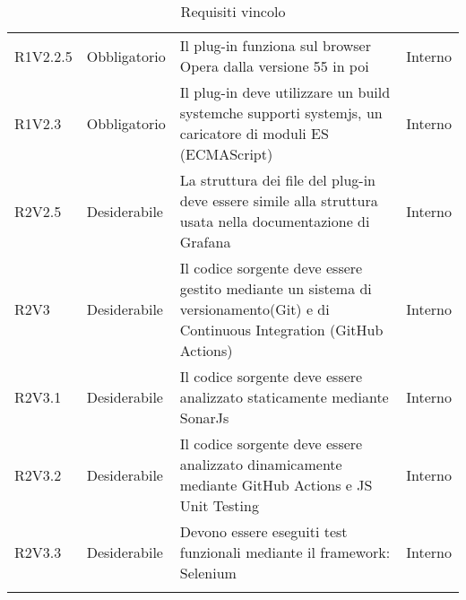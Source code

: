 \begin{longtable} {
		>{\centering}p{18mm} 
		>{\centering}p{28mm}
		>{}p{50mm} 
		>{}p{28mm}
		}
	R1V2.2.5 & 
	Obbligatorio & 
	Il plug-in funziona sul browser Opera dalla versione 55 in poi &
	Interno  \TBstrut \\ [2mm]
	
	R1V2.3 & 
	Obbligatorio & 
	Il plug-in deve utilizzare un build system\glosp che supporti systemjs, un caricatore di moduli ES (ECMAScript) &
	Interno  \TBstrut \\ [2mm]
	
	R2V2.5 &
	Desiderabile &
	La struttura dei file del plug-in deve essere simile alla struttura usata nella documentazione di Grafana\glo &
	Interno  \TBstrut \\ [2mm]
		
	R2V3 &
	Desiderabile &
	Il codice sorgente deve essere gestito mediante un sistema di versionamento\glosp (Git) e di Continuous Integration (GitHub Actions) &
	Interno  \TBstrut \\ [2mm]		
	
	R2V3.1 &
	Desiderabile &
	Il codice sorgente deve essere analizzato staticamente mediante SonarJs\glo &
	Interno  \TBstrut \\ [2mm]
	
	R2V3.2 &
	Desiderabile &
	Il codice sorgente deve essere analizzato dinamicamente mediante GitHub Actions e JS Unit Testing &
	Interno  \TBstrut \\ [2mm]
	
	R2V3.3 &
	Desiderabile &
	Devono essere eseguiti test funzionali mediante il framework: Selenium &
	Interno  \TBstrut \\ [2mm]
	\rowcolor{white}
	\caption{Requisiti vincolo}
\end{longtable}
